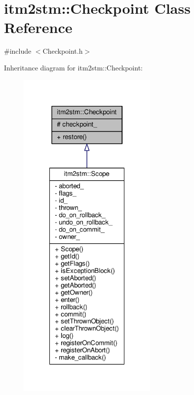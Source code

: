 \hypertarget{classitm2stm_1_1Checkpoint}{\section{itm2stm\-:\-:Checkpoint Class Reference}
\label{classitm2stm_1_1Checkpoint}
}


{\ttfamily \#include $<$Checkpoint.\-h$>$}



Inheritance diagram for itm2stm\-:\-:Checkpoint\-:
\nopagebreak
\begin{figure}[H]
\begin{center}
\leavevmode
\includegraphics[width=192pt]{classitm2stm_1_1Checkpoint__inherit__graph}
\end{center}
\end{figure}


